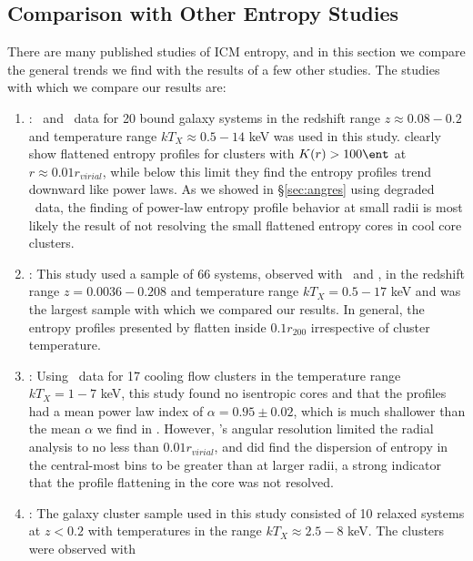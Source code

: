\documentclass{emulateapj}
\begin{document}
\subsection{Comparison with Other Entropy Studies}
\label{sec:comp}

There are many published studies of ICM entropy, and in this section
we compare the general trends we find with the results of a few other
studies. The studies with which we compare our results are:
\begin{enumerate}
\item \citet{davies00}: \rosat\ and \asca\ data for 20 bound galaxy
  systems in the redshift range $z \approx 0.08-0.2$ and temperature
  range $kT_X \approx 0.5-14$ keV was used in this
  study. \citet{davies00} clearly show flattened entropy profiles for
  clusters with $K(r) > 100 \ent$ at $r \approx 0.01 r_{virial}$,
  while below this limit they find the entropy profiles trend downward
  like power laws. As we showed in \S\ref{sec:angres} using degraded
  \xmm\ data, the finding of power-law entropy profile behavior at
  small radii is most likely the result of not resolving the small
  flattened entropy cores in cool core clusters.
\item \citet{ponman03}: This study used a sample of 66 systems,
  observed with \rosat\ and \asca, in the redshift range $z=
  0.0036-0.208$ and temperature range $kT_X = 0.5-17$ keV and was the
  largest sample with which we compared our results. In general, the
  entropy profiles presented by \citet{ponman03} flatten inside $0.1
  r_{200}$ irrespective of cluster temperature.
\item \citet{piffaretti05}: Using \xmm\ data for 17 cooling flow
  clusters in the temperature range $kT_X = 1-7$ keV, this study found
  no isentropic cores and that the profiles had a mean power law index
  of $\alpha = 0.95 \pm 0.02$, which is much shallower than the mean
  $\alpha$ we find in \accept. However, \xmm's angular resolution
  limited the radial analysis to no less than $0.01 r_{virial}$, and
  \citet{piffaretti05} did find the dispersion of entropy in the
  central-most bins to be greater than at larger radii, a strong
  indicator that the profile flattening in the core was not resolved.
\item \citet{pratt06}: The galaxy cluster sample used in this study
  consisted of 10 relaxed systems at $z < 0.2$ with temperatures in
  the range $kT_X \approx 2.5-8$ keV. The clusters were observed with

\end{enumerate}
\end{document}
